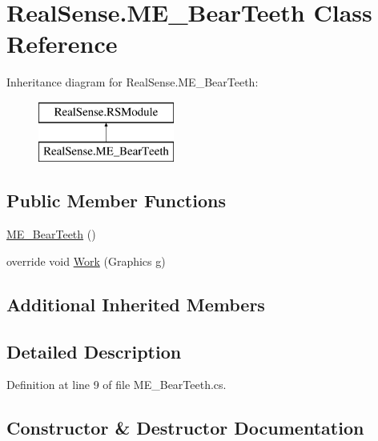 \hypertarget{class_real_sense_1_1_m_e___bear_teeth}{}\section{Real\+Sense.\+M\+E\+\_\+\+Bear\+Teeth Class Reference}
\label{class_real_sense_1_1_m_e___bear_teeth}
Inheritance diagram for Real\+Sense.\+M\+E\+\_\+\+Bear\+Teeth\+:\begin{figure}[H]
\begin{center}
\leavevmode
\includegraphics[height=2.000000cm]{class_real_sense_1_1_m_e___bear_teeth}
\end{center}
\end{figure}
\subsection*{Public Member Functions}
\begin{DoxyCompactItemize}
\item 
\hyperlink{class_real_sense_1_1_m_e___bear_teeth_a3500b0821cc64ae9909c1f273c1121f0}{M\+E\+\_\+\+Bear\+Teeth} ()
\item 
override void \hyperlink{class_real_sense_1_1_m_e___bear_teeth_a2e4cc340fec3499318fa7514ee7f1822}{Work} (Graphics g)
\end{DoxyCompactItemize}
\subsection*{Additional Inherited Members}


\subsection{Detailed Description}


Definition at line 9 of file M\+E\+\_\+\+Bear\+Teeth.\+cs.



\subsection{Constructor \& Destructor Documentation}
\mbox{\label{class_real_sense_1_1_m_e___bear_teeth_a3500b0821cc64ae9909c1f273c1121f0}} 
